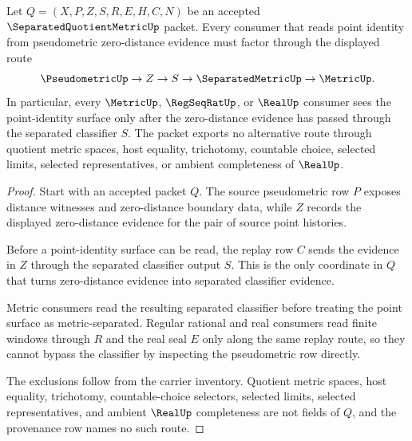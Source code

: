 \begin{theorem}
\label{thm:separated-quotient-metric-zero-distance-route}
Let $Q=(X,P,Z,S,R,E,H,C,N)$ be an accepted $\SeparatedQuotientMetricUp$ packet. Every consumer that reads point identity from pseudometric zero-distance evidence must factor through the displayed route
$$
\PseudometricUp\to Z\to S\to\SeparatedMetricUp\to\MetricUp .
$$
In particular, every $\MetricUp$, $\RegSeqRatUp$, or $\RealUp$ consumer sees the point-identity surface only after the zero-distance evidence has passed through the separated classifier $S$. The packet exports no alternative route through quotient metric spaces, host equality, trichotomy, countable choice, selected limits, selected representatives, or ambient completeness of $\RealUp$.
\end{theorem}
\begin{proof}
Start with an accepted packet $Q$. The source pseudometric row $P$ exposes distance witnesses and zero-distance boundary data, while $Z$ records the displayed zero-distance evidence for the pair of source point histories.

Before a point-identity surface can be read, the replay row $C$ sends the evidence in $Z$ through the separated classifier output $S$. This is the only coordinate in $Q$ that turns zero-distance evidence into separated classifier evidence.

Metric consumers read the resulting separated classifier before treating the point surface as metric-separated. Regular rational and real consumers read finite windows through $R$ and the real seal $E$ only along the same replay route, so they cannot bypass the classifier by inspecting the pseudometric row directly.

The exclusions follow from the carrier inventory. Quotient metric spaces, host equality, trichotomy, countable-choice selectors, selected limits, selected representatives, and ambient $\RealUp$ completeness are not fields of $Q$, and the provenance row names no such route.
\end{proof}


